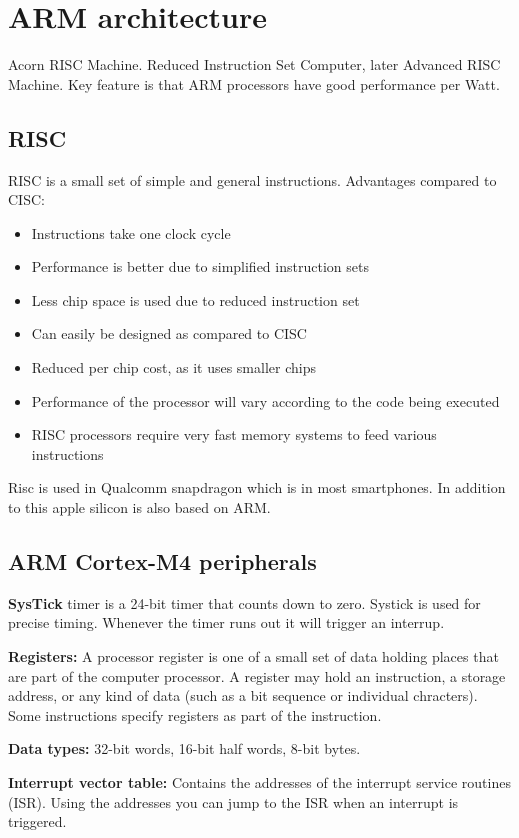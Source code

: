 \section{ARM architecture}

Acorn RISC Machine. Reduced Instruction Set Computer, later Advanced RISC Machine.
Key feature is that ARM processors have good performance per Watt.



\subsection{RISC}

RISC is a small set of simple and general instructions.
Advantages compared to CISC:
\begin{itemize}
	\item Instructions take one clock cycle
	\item Performance is better due to simplified instruction sets
	\item Less chip space is used due to reduced instruction set
	\item Can easily be designed as compared to CISC
	\item Reduced per chip cost, as it uses smaller chips
\end{itemize}

\begin{itemize}
	\item Performance of the processor will vary according to the code being executed
	\item RISC processors require very fast memory systems to feed various instructions
\end{itemize}

Risc is used in Qualcomm snapdragon which is in most smartphones.
In addition to this apple silicon is also based on ARM.


\subsection{ARM Cortex-M4 peripherals}

\textbf{SysTick} timer is a 24-bit timer that counts down to zero.
Systick is used for precise timing. Whenever the timer runs out
it will trigger an interrup.


\textbf{Registers:} A processor register is one of a small set of data holding places
that are part of the computer processor. A register may hold an instruction,
a storage address, or any kind of data (such as a bit sequence or individual chracters).
Some  instructions specify registers as part of the instruction.

\textbf{Data types:} 32-bit words, 16-bit half words, 8-bit bytes.

\textbf{Interrupt vector table:} Contains the addresses of the interrupt service routines (ISR).
Using the addresses you can jump to the ISR when an interrupt is triggered.
